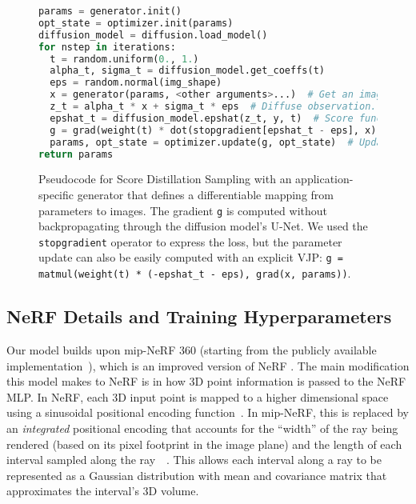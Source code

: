 \documentclass{article} \usepackage{iclr2023_conference,times}
\newcommand{\sname}{Score Distillation Sampling\xspace}
\begin{document}
\begin{figure}[h]
\begin{lstlisting}[language=Python]
params = generator.init()
opt_state = optimizer.init(params)
diffusion_model = diffusion.load_model()
for nstep in iterations:
  t = random.uniform(0., 1.)
  alpha_t, sigma_t = diffusion_model.get_coeffs(t)
  eps = random.normal(img_shape)
  x = generator(params, <other arguments>...)  # Get an image observation.
  z_t = alpha_t * x + sigma_t * eps  # Diffuse observation.
  epshat_t = diffusion_model.epshat(z_t, y, t)  # Score function evaluation.
  g = grad(weight(t) * dot(stopgradient[epshat_t - eps], x), params)
  params, opt_state = optimizer.update(g, opt_state)  # Update params with optimizer.
return params
\end{lstlisting}
\caption{Pseudocode for \sname with an application-specific generator that defines a differentiable mapping from parameters to images. The gradient \texttt{g} is computed without backpropagating through the diffusion model's U-Net. We used the \texttt{stopgradient} operator to express the loss, but the parameter update can also be easily computed with an explicit VJP: {\texttt{g = matmul(weight(t) * (-epshat\_t - eps), grad(x, params))}}.}
\label{fig:score_sampling_code}
\end{figure}







\subsection{NeRF Details and Training Hyperparameters}
\label{sec:nerf_hparams}

Our model builds upon mip-NeRF 360 \citep{Barron2021MipNeRF3U} (starting from the publicly available implementation~\citeyear{multinerf2022}), which is an improved version of NeRF \citep{mildenhall2020nerf}. The main modification this model makes to NeRF is in how 3D point information is passed to the NeRF MLP. In NeRF, each 3D input point is mapped to a higher dimensional space using a sinusoidal positional encoding function~\citep{vaswani2017attention}. In mip-NeRF, this is replaced by an \emph{integrated} positional encoding that accounts for the ``width'' of the ray being rendered (based on its pixel footprint in the image plane) and the length of each interval  sampled along the ray~~\citep{barron2021mip}. This allows each interval along a ray to be represented as a Gaussian distribution with mean  and covariance matrix  that approximates the interval's 3D volume.
\end{document}
